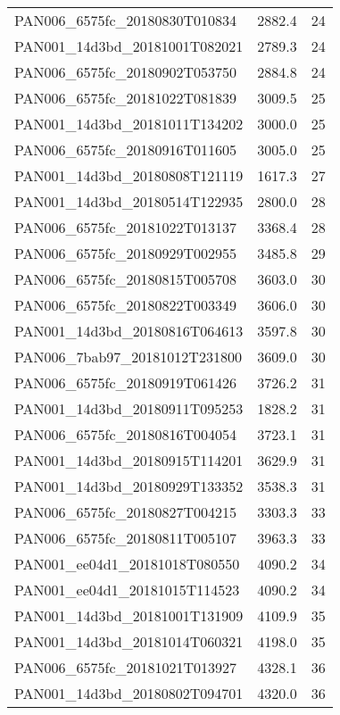 \begin{tabular}{lrr}
PAN006\_6575fc\_20180830T010834 &     2882.4 &       24 \\
PAN001\_14d3bd\_20181001T082021 &     2789.3 &       24 \\
PAN006\_6575fc\_20180902T053750 &     2884.8 &       24 \\
PAN006\_6575fc\_20181022T081839 &     3009.5 &       25 \\
PAN001\_14d3bd\_20181011T134202 &     3000.0 &       25 \\
PAN006\_6575fc\_20180916T011605 &     3005.0 &       25 \\
PAN001\_14d3bd\_20180808T121119 &     1617.3 &       27 \\
PAN001\_14d3bd\_20180514T122935 &     2800.0 &       28 \\
PAN006\_6575fc\_20181022T013137 &     3368.4 &       28 \\
PAN006\_6575fc\_20180929T002955 &     3485.8 &       29 \\
PAN006\_6575fc\_20180815T005708 &     3603.0 &       30 \\
PAN006\_6575fc\_20180822T003349 &     3606.0 &       30 \\
PAN001\_14d3bd\_20180816T064613 &     3597.8 &       30 \\
PAN006\_7bab97\_20181012T231800 &     3609.0 &       30 \\
PAN006\_6575fc\_20180919T061426 &     3726.2 &       31 \\
PAN001\_14d3bd\_20180911T095253 &     1828.2 &       31 \\
PAN006\_6575fc\_20180816T004054 &     3723.1 &       31 \\
PAN001\_14d3bd\_20180915T114201 &     3629.9 &       31 \\
PAN001\_14d3bd\_20180929T133352 &     3538.3 &       31 \\
PAN006\_6575fc\_20180827T004215 &     3303.3 &       33 \\
PAN006\_6575fc\_20180811T005107 &     3963.3 &       33 \\
PAN001\_ee04d1\_20181018T080550 &     4090.2 &       34 \\
PAN001\_ee04d1\_20181015T114523 &     4090.2 &       34 \\
PAN001\_14d3bd\_20181001T131909 &     4109.9 &       35 \\
PAN001\_14d3bd\_20181014T060321 &     4198.0 &       35 \\
PAN006\_6575fc\_20181021T013927 &     4328.1 &       36 \\
PAN001\_14d3bd\_20180802T094701 &     4320.0 &       36 \\

\end{tabular}
